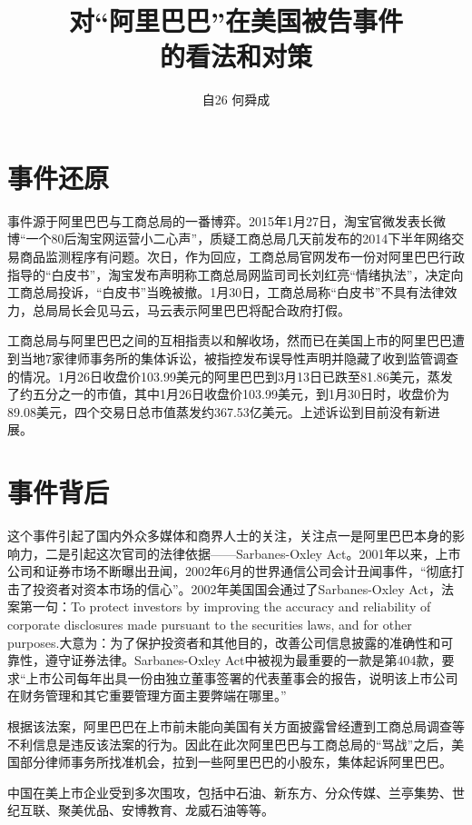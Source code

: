 \documentclass[UTF8]{ctexart}
\author{自26 何舜成}
\title{对“阿里巴巴”在美国被告事件\\的看法和对策}
\begin{document}
\maketitle
\section{事件还原}
事件源于阿里巴巴与工商总局的一番博弈。2015年1月27日，淘宝官微发表长微博“一个80后淘宝网运营小二心声”，质疑工商总局几天前发布的2014下半年网络交易商品监测程序有问题。次日，作为回应，工商总局官网发布一份对阿里巴巴行政指导的“白皮书”，淘宝发布声明称工商总局网监司司长刘红亮“情绪执法”，决定向工商总局投诉，“白皮书”当晚被撤。1月30日，工商总局称“白皮书”不具有法律效力，总局局长会见马云，马云表示阿里巴巴将配合政府打假。\cite{Jing}\par
工商总局与阿里巴巴之间的互相指责以和解收场，然而已在美国上市的阿里巴巴遭到当地7家律师事务所的集体诉讼，被指控发布误导性声明并隐藏了收到监管调查的情况。1月26日收盘价103.99美元的阿里巴巴到3月13日已跌至81.86美元\cite{SinaNews}，蒸发了约五分之一的市值，其中1月26日收盘价103.99美元，到1月30日时，收盘价为89.08美元，四个交易日总市值蒸发约367.53亿美元。\cite{Jing}上述诉讼到目前没有新进展。
\section{事件背后}
这个事件引起了国内外众多媒体和商界人士的关注，关注点一是阿里巴巴本身的影响力，二是引起这次官司的法律依据——Sarbanes-Oxley Act。2001年以来，上市公司和证券市场不断曝出丑闻，2002年6月的世界通信公司会计丑闻事件，“彻底打击了投资者对资本市场的信心”\cite{Wiki}。2002年美国国会通过了Sarbanes-Oxley Act，法案第一句：To protect investors by improving the accuracy and reliability of corporate disclosures made pursuant to the securities laws, and for other purposes.\cite{GPO}大意为：为了保护投资者和其他目的，改善公司信息披露的准确性和可靠性，遵守证券法律。Sarbanes-Oxley Act中被视为最重要的一款是第404款，要求“上市公司每年出具一份由独立董事签署的代表董事会的报告，说明该上市公司在财务管理和其它重要管理方面主要弊端在哪里。”\cite{Baidu}\par
根据该法案，阿里巴巴在上市前未能向美国有关方面披露曾经遭到工商总局调查等不利信息是违反该法案的行为。因此在此次阿里巴巴与工商总局的“骂战”之后，美国部分律师事务所找准机会，拉到一些阿里巴巴的小股东，集体起诉阿里巴巴。\par
中国在美上市企业受到多次围攻，包括中石油、新东方、分众传媒、兰亭集势、世纪互联、聚美优品、安博教育、龙威石油等等。\cite{Jing}
\end{document}
